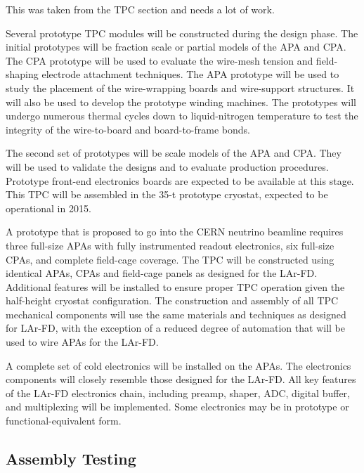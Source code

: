 \begin{editornote}
  This was taken from the TPC section and needs a lot of work.
\end{editornote}

Several prototype TPC modules will be constructed during the 
design phase.  The initial prototypes will be fraction scale or 
partial models of the APA and CPA.  The CPA prototype will be used 
to evaluate the wire-mesh tension and field-shaping electrode 
attachment techniques.   The APA prototype will be used to study 
the placement of the wire-wrapping boards and wire-support structures.  
It will also be used to develop the prototype winding machines.  
The prototypes will undergo numerous thermal cycles down to 
liquid-nitrogen temperature to test the integrity of the wire-to-board
and board-to-frame bonds.

The second set of prototypes will be scale models of the 
APA and CPA.  They will be used to validate the designs and 
to evaluate production procedures.  Prototype front-end electronics 
boards are expected to be available at this stage.  This TPC will be assembled in the 35-t prototype cryostat, expected to be operational in 2015.

A prototype that is proposed to go into the CERN neutrino beamline requires three full-size APAs with fully instrumented readout electronics, six full-size CPAs, and complete field-cage coverage.  The TPC will be constructed using identical APAs, CPAs and field-cage panels as designed for the LAr-FD.  Additional features will be installed to ensure proper TPC operation given the half-height cryostat configuration. The construction and assembly of all TPC mechanical components will use the same materials and techniques as designed for LAr-FD, with the exception of a reduced degree of automation that will be used to wire APAs for the LAr-FD.

A complete set of cold electronics will be installed on the APAs.  The electronics components will closely resemble those designed for the LAr-FD. All key features of the LAr-FD electronics chain, including preamp, shaper, ADC, digital buffer,
and multiplexing will be implemented.  Some  electronics  may be in prototype or functional-equivalent form.

\subsection{Assembly Testing}
\label{sec:ce-checkout-test}

